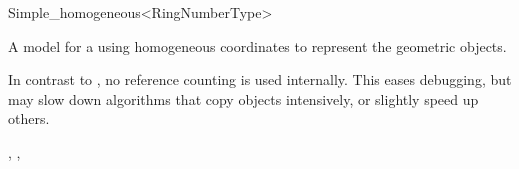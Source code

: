 \begin{ccRefClass}{Simple_homogeneous<RingNumberType>}

\ccDefinition
A model for a  using homogeneous coordinates to represent the
geometric objects. 

\ccRefines
{}

\ccTypes
{}
\ccGlue
{}

\ccImplementation In contrast to , no reference counting
is used internally. This eases debugging, but may slow down algorithms
that copy objects intensively, or slightly speed up others.

\ccSeeAlso
{}, ,
\end{ccRefClass}

